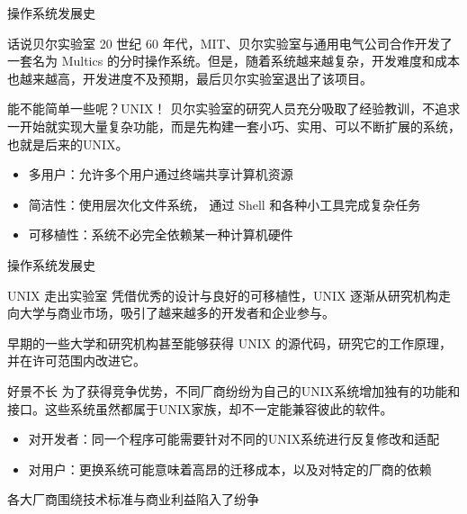 \documentclass[aspectratio=169]{beamer}
\begin{document}
\begin{frame}{操作系统发展史}
\begin{block}{话说贝尔实验室}
\hspace*{2em}20 世纪 60 年代，MIT、贝尔实验室与通用电气公司合作开发了一套名为 Multics 的分时操作系统。但是，随着系统越来越复杂，开发难度和成本也越来越高，开发进度不及预期，最后贝尔实验室退出了该项目。
\end{block}
\begin{block}{能不能简单一些呢？UNIX！}
\hspace*{2em}贝尔实验室的研究人员充分吸取了经验教训，不追求一开始就实现大量复杂功能，而是先构建一套小巧、实用、可以不断扩展的系统，也就是后来的UNIX。
\begin{itemize}
	\item 多用户：允许多个用户通过终端共享计算机资源
	\item 简洁性：使用层次化文件系统，
	通过 Shell 和各种小工具完成复杂任务
	\item 可移植性：系统不必完全依赖某一种计算机硬件
\end{itemize}
\end{block}
\end{frame}


\begin{frame}{操作系统发展史}
	
	\begin{block}{UNIX 走出实验室}
		\hspace*{2em}凭借优秀的设计与良好的可移植性，UNIX 逐渐从研究机构走向大学与商业市场，吸引了越来越多的开发者和企业参与。
		
		\par\hspace*{2em}早期的一些大学和研究机构甚至能够获得 UNIX 的源代码，研究它的工作原理，并在许可范围内改进它。
	\end{block}
	
	\begin{block}{好景不长}
		\hspace*{2em}为了获得竞争优势，不同厂商纷纷为自己的UNIX系统增加独有的功能和接口。这些系统虽然都属于UNIX家族，却不一定能兼容彼此的软件。
		\begin{itemize}
			\item 对开发者：同一个程序可能需要针对不同的UNIX系统进行反复修改和适配
			\item 对用户：更换系统可能意味着高昂的迁移成本，以及对特定的厂商的依赖
		\end{itemize}
		\par\hspace*{2em}\alert{各大厂商围绕技术标准与商业利益陷入了纷争}
	\end{block}
\end{frame}
\end{document}
